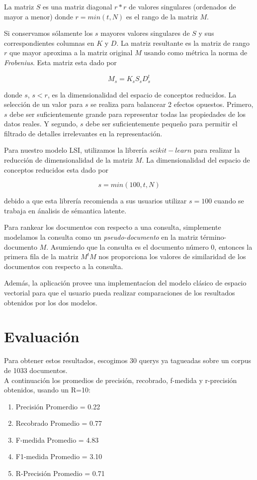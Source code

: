 \documentclass[a4paper, 10pt]{article}
\begin{document}
	La matriz $S$ es una matriz diagonal $r*r$ de valores singulares (ordenados de mayor a menor) donde $r = min(t, N)$ es el rango de la matriz $M$.
	
	Si conservamos s\'olamente los $s$ mayores valores singulares de $S$ y sus correspondientes columnas en $K$ y $D$. La matriz resultante es la matriz de rango $r$ que mayor aproxima a la matriz original $M$ usando como m\'etrica la norma de \textit{Frobenius}. Esta matriz esta dado por
	
	\begin{equation}		
		M_s = K_sS_sD^t_s
	\end{equation}

	donde $s$, $s < r$, es la dimensionalidad del espacio de conceptos reducidos. La selecci\'on de un valor para $s$ se realiza para balancear 2 efectos opuestos. Primero, $s$ debe ser suficientemente grande para representar todas las propiedades de los datos reales. Y segundo, $s$ debe ser suficientemente peque\~no para permitir el filtrado de detalles irrelevantes en la representaci\'on.

	Para nuestro modelo LSI, utilizamos la librer\'ia $scikit-learn$ para realizar la reducci\'on de dimensionalidad de la matriz $M$. La dimensionalidad del espacio de conceptos reducidos esta dado por

	\begin{equation}
		s = min(100, t, N)	
	\end{equation}

	debido a que esta librer\'ia recomienda a sus usuarios utilizar $s = 100$ cuando se trabaja en \'analisis de s\'emantica latente.

	Para rankear los documentos con respecto a una consulta, simplemente modelamos la consulta como un \textit{pseudo-documento} en la matriz t\'ermino-documento $M$. Asumiendo que la consulta es el documento n\'umero 0, entonces la primera fila de la matriz $M^tM$ nos proporciona los valores de similaridad de los documentos con respecto a la consulta.

	Adem\'as, la aplicaci\'on provee una implementac\'ion del modelo cl\'asico de espacio vectorial para que el usuario pueda realizar comparaciones de los resultados obtenidos por los dos modelos.

	\section{Evaluación}
	Para obtener estos resultados, escogimos 30 querys ya tagueadas sobre un corpus de 1033 documentos.\\ A continuación los promedios de precisión, recobrado, f-medida y r-precisión obtenidos, usando un R=10:
	\begin{enumerate}
       \item Precisión Promerdio = 0.22
        \item Recobrado Promedio = 0.77
        \item F-medida Promedio = 4.83
        \item F1-medida Promedio = 3.10
        \item R-Precisión Promedio = 0.71

    \end{enumerate}
\end{document}
